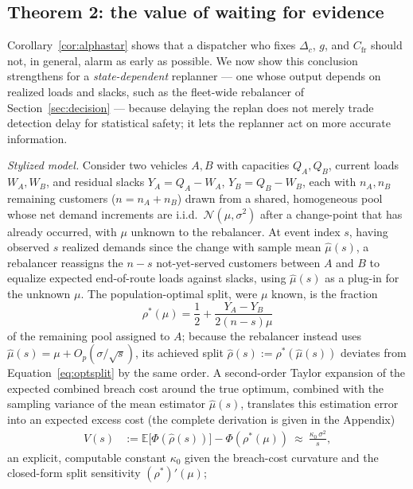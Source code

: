 \documentclass[trsc,dblanonrev]{informs4}
\newcommand{\E}{\mathbb{E}}
\newcommand{\N}{\mathcal{N}}
\begin{document}
\subsection{Theorem 2: the value of waiting for evidence}

Corollary~\ref{cor:alphastar} shows that a dispatcher who fixes
$\Delta_c$, $g$, and $C_{\mathrm{fr}}$ should not, in general, alarm as
early as possible. We now show this conclusion strengthens for a
\emph{state-dependent} replanner --- one whose output depends on
realized loads and slacks, such as the fleet-wide rebalancer of
Section~\ref{sec:decision} --- because delaying the replan does not
merely trade detection delay for statistical safety; it lets the
replanner act on more accurate information.

\emph{Stylized model.} Consider two vehicles $A, B$ with capacities
$Q_A, Q_B$, current loads $W_A, W_B$, and residual slacks $Y_A = Q_A -
W_A$, $Y_B = Q_B - W_B$, each with $n_A, n_B$ remaining customers ($n =
n_A + n_B$) drawn from a shared, homogeneous pool whose net demand
increments are i.i.d.\ $\N(\mu, \sigma^2)$ after a change-point that has
already occurred, with $\mu$ unknown to the rebalancer. At event index
$s$, having observed $s$ realized demands since the change with sample
mean $\widehat\mu(s)$, a rebalancer reassigns the $n - s$ not-yet-served
customers between $A$ and $B$ to equalize expected end-of-route loads
against slacks, using $\widehat\mu(s)$ as a plug-in for the unknown
$\mu$. The population-optimal split, were $\mu$ known, is the fraction
\begin{equation}\label{eq:optsplit}
\rho^\ast(\mu) = \frac12 + \frac{Y_A - Y_B}{2(n-s)\mu}
\end{equation}
of the remaining pool assigned to $A$; because the rebalancer instead
uses $\widehat\mu(s) = \mu + O_p(\sigma/\sqrt s)$, its achieved split
$\widehat\rho(s) := \rho^\ast(\widehat\mu(s))$ deviates from
Equation~\eqref{eq:optsplit} by the same order. A second-order Taylor
expansion of the expected combined breach cost around the true
optimum, combined with the sampling variance of the mean estimator
$\widehat\mu(s)$, translates this estimation error into an expected
excess cost (the complete derivation is given in the Appendix)
\begin{align}
V(s) &:= \E\bigl[\Phi(\widehat\rho(s))\bigr] - \Phi(\rho^\ast(\mu))
\ \approx\ \frac{\kappa_0\, \sigma^2}{s}, \label{eq:vs}
\end{align}
an explicit, computable constant $\kappa_0$ given the breach-cost
curvature and the closed-form split sensitivity $(\rho^\ast)'(\mu)$;
\end{document}
